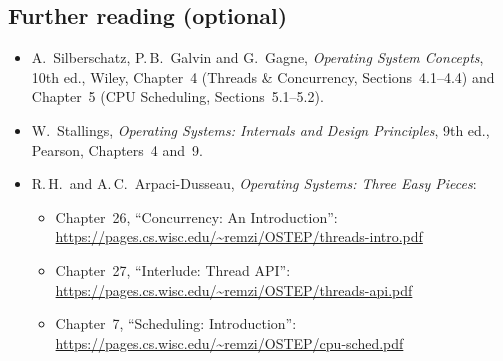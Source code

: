 \documentclass[11pt,a4paper]{article}
\begin{document}
\subsection*{Further reading (optional)}
\begin{itemize}
  \item A.\ Silberschatz, P.\,B.\ Galvin and G.\ Gagne, \emph{Operating System Concepts}, 10th ed., Wiley, Chapter~4 (Threads \& Concurrency, Sections~4.1--4.4) and Chapter~5 (CPU Scheduling, Sections~5.1--5.2).
  \item W.\ Stallings, \emph{Operating Systems: Internals and Design Principles}, 9th ed., Pearson, Chapters~4 and~9.
  \item R.\,H.\ and A.\,C.\ Arpaci-Dusseau, \emph{Operating Systems: Three Easy Pieces}:
  \begin{itemize}
    \item Chapter~26, ``Concurrency: An Introduction'': \url{https://pages.cs.wisc.edu/~remzi/OSTEP/threads-intro.pdf}
    \item Chapter~27, ``Interlude: Thread API'': \url{https://pages.cs.wisc.edu/~remzi/OSTEP/threads-api.pdf}
    \item Chapter~7, ``Scheduling: Introduction'': \url{https://pages.cs.wisc.edu/~remzi/OSTEP/cpu-sched.pdf}
  \end{itemize}
\end{itemize}
\end{document}
